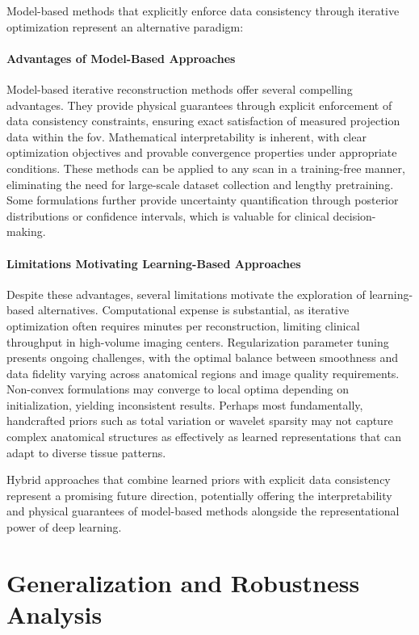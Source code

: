Model-based methods that explicitly enforce data consistency through iterative optimization represent an alternative paradigm:

\paragraph{Advantages of Model-Based Approaches}
Model-based iterative reconstruction methods offer several compelling advantages. They provide physical guarantees through explicit enforcement of data consistency constraints, ensuring exact satisfaction of measured projection data within the \gls{fov}. Mathematical interpretability is inherent, with clear optimization objectives and provable convergence properties under appropriate conditions. These methods can be applied to any scan in a training-free manner, eliminating the need for large-scale dataset collection and lengthy pretraining. Some formulations further provide uncertainty quantification through posterior distributions or confidence intervals, which is valuable for clinical decision-making.

\paragraph{Limitations Motivating Learning-Based Approaches}
Despite these advantages, several limitations motivate the exploration of learning-based alternatives. Computational expense is substantial, as iterative optimization often requires minutes per reconstruction, limiting clinical throughput in high-volume imaging centers. Regularization parameter tuning presents ongoing challenges, with the optimal balance between smoothness and data fidelity varying across anatomical regions and image quality requirements. Non-convex formulations may converge to local optima depending on initialization, yielding inconsistent results. Perhaps most fundamentally, handcrafted priors such as total variation or wavelet sparsity may not capture complex anatomical structures as effectively as learned representations that can adapt to diverse tissue patterns.

Hybrid approaches that combine learned priors with explicit data consistency represent a promising future direction, potentially offering the interpretability and physical guarantees of model-based methods alongside the representational power of deep learning.

\section{Generalization and Robustness Analysis}

